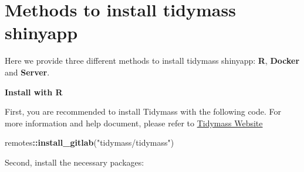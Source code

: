 \documentclass[
]{book}
\newenvironment{Shaded}{\begin{snugshade}}{\end{snugshade}}
\newcommand{\FunctionTok}[1]{\textcolor[rgb]{0.13,0.29,0.53}{\textbf{#1}}}
\newcommand{\NormalTok}[1]{#1}
\newcommand{\SpecialCharTok}[1]{\textcolor[rgb]{0.81,0.36,0.00}{\textbf{#1}}}
\newcommand{\StringTok}[1]{\textcolor[rgb]{0.31,0.60,0.02}{#1}}
\begin{document}
\section{Methods to install tidymass shinyapp}\label{methods-to-install-tidymass-shinyapp}

Here we provide three different methods to install tidymass shinyapp: \textbf{R}, \textbf{Docker} and \textbf{Server}.

\textbf{Install with R}

First, you are recommended to install Tidymass with the following code. For more information and help document, please refer to \href{https://www.tidymass.org/}{Tidymass Website}

\begin{Shaded}
\begin{Highlighting}[]
\NormalTok{remotes}\SpecialCharTok{::}\FunctionTok{install\_gitlab}\NormalTok{(}\StringTok{"tidymass/tidymass"}\NormalTok{)}
\end{Highlighting}
\end{Shaded}

Second, install the necessary packages:
\end{document}
